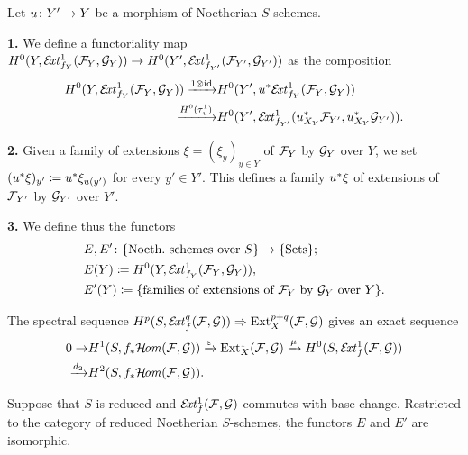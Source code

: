 \begin{definition} 
	Let $u\colon Y'\to Y$ be a morphism of Noetherian $S$-schemes.

	\textbf{1.} We define a functoriality map
	$H^0(Y,\mathcal{E}\!\mathit{xt}^1_{f_Y}(\mathcal{F}_Y,\mathcal{G}_Y))
	\to
	H^0(Y',\mathcal{E}\!\mathit{xt}^1_{f_{Y'}}(\mathcal{F}_{Y'},\mathcal{G}_{Y'}))
	$
	as the composition
	\begin{align*}
		H^0(Y,\mathcal{E}\!\mathit{xt}^1_{f_Y}(\mathcal{F}_Y,\mathcal{G}_Y))
		\xrightarrow{1\otimes \operatorname{id}} & 
		H^0(Y',u^{*}\mathcal{E}\!\mathit{xt}^1_{f_Y}(\mathcal{F}_Y,\mathcal{G}_Y)) \\
		\xrightarrow{H^0(\tau^1_u)} &
		H^0(Y',\mathcal{E}\!\mathit{xt}^1_{f_{Y'}}(u_{X_Y}^{*}\mathcal{F}_{Y'},u_{X_Y}^{*}\mathcal{G}_{Y'})).
	\end{align*}

	\textbf{2.} Given a family of extensions $\xi = (\xi_y)_{y\in Y}$ of $\mathcal{F}_Y$ by $\mathcal{G}_Y$ over $Y$, we set $(u^{*}\xi)_{y'} \coloneqq u^{*}\xi_{u(y')}$ for every $y' \in Y'$. This defines a family $u^{*}\xi$ of extensions of $\mathcal{F}_{Y'}$ by $\mathcal{G}_{Y'}$ over $Y'$.

	\textbf{3.} We define thus the functors
	\begin{align*}
		& E,E' \colon \{\text{Noeth.\ schemes over } S\} \to \{\text{Sets}\}; \\
		& E(Y) \coloneqq H^0(Y,\mathcal{E}\!\mathit{xt}^1_{f_Y}(\mathcal{F}_Y,\mathcal{G}_Y)), \\
		& E'(Y) \coloneqq \{\text{families of extensions of $\mathcal{F}_Y$ by $\mathcal{G}_Y$ over } Y\}. \\
	\end{align*}

\end{definition}

\begin{remark}
	The spectral sequence $H^p(S,\mathcal{E}\!\mathit{xt}^q_f(\mathcal{F},\mathcal{G})) \Rightarrow \operatorname{Ext}^{p+q}_X(\mathcal{F},\mathcal{G})$ gives an exact sequence
	\begin{align*}
		0
		 \to & H^1(S,f_{*}\mathcal{H}\!\mathit{om}(\mathcal{F},\mathcal{G}))
		 \xrightarrow{\varepsilon} \operatorname{Ext}^1_X(\mathcal{F},\mathcal{G})
		 \xrightarrow{\mu} H^0(S,\mathcal{E}\!\mathit{xt}^1_f(\mathcal{F},\mathcal{G})) \\
		 \xrightarrow{d_2} & H^2(S,f_{*}\mathcal{H}\!\mathit{om}(\mathcal{F},\mathcal{G})).
	\end{align*}
\end{remark}

\begin{proposition}
	Suppose that $S$ is reduced and $\mathcal{E}\!\mathit{xt}^1_f(\mathcal{F},\mathcal{G})$ commutes with base change. Restricted to the category of reduced Noetherian $S$-schemes, the functors $E$ and $E'$ are isomorphic.
\end{proposition}


